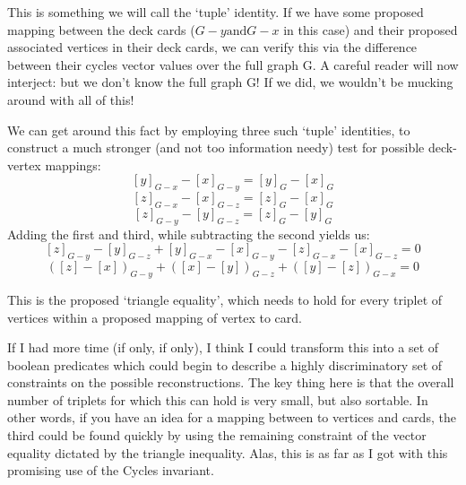This is something we will call the `tuple' identity.
If we have some proposed mapping between the deck cards ($G - y \text{and} G - x$ in this case) and their proposed associated vertices in their deck cards, we can verify this via the difference between their cycles vector values over the full graph G.
A careful reader will now interject: but we don't know the full graph G! If we did, we wouldn't be mucking around with all of this!

We can get around this fact by employing three such `tuple' identities, to construct a much stronger (and not too information needy) test for possible deck-vertex mappings:
$$[y]_{G - x} - [x]_{G - y} = [y]_{G} - [x]_G$$
$$[z]_{G - x} - [x]_{G - z} = [z]_{G} - [x]_G$$
$$[z]_{G - y} - [y]_{G - z} = [z]_{G} - [y]_G$$
Adding the first and third, while subtracting the second yields us:
$$[z]_{G - y} - [y]_{G - z} + [y]_{G - x} - [x]_{G - y} - [z]_{G - x} - [x]_{G - z} = 0$$
$$([z] - [x])_{G - y} + ([x] - [y])_{G - z} + ([y] - [z])_{G - x} = 0$$

This is the proposed `triangle equality', which needs to hold for every triplet of vertices within a proposed mapping of vertex to card.

If I had more time (if only, if only), I think I could transform this into a set of boolean predicates which could begin to describe a highly discriminatory set of constraints on the possible reconstructions.
The key thing here is that the overall number of triplets for which this can hold is very small, but also sortable. 
In other words, if you have an idea for a mapping between to vertices and cards, the third could be found quickly by using the remaining constraint of the vector equality dictated by the triangle inequality.
Alas, this is as far as I got with this promising use of the Cycles invariant.
